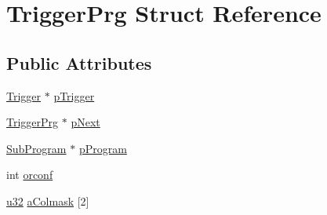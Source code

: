 \hypertarget{struct_trigger_prg}{\section{Trigger\-Prg Struct Reference}
\label{struct_trigger_prg}
}
\subsection*{Public Attributes}
\begin{DoxyCompactItemize}
\item 
\hyperlink{struct_trigger}{Trigger} $\ast$ \hyperlink{struct_trigger_prg_af70e5a74c954bc7a1eb8ee1162c40368}{p\-Trigger}
\item 
\hyperlink{struct_trigger_prg}{Trigger\-Prg} $\ast$ \hyperlink{struct_trigger_prg_a551b8a29a8c4ff785afab1596e5d8710}{p\-Next}
\item 
\hyperlink{struct_sub_program}{Sub\-Program} $\ast$ \hyperlink{struct_trigger_prg_aa770aee270c7c5df85578dc4a6686134}{p\-Program}
\item 
int \hyperlink{struct_trigger_prg_aa475acda58c472b3491f6aa17020bf68}{orconf}
\item 
\hyperlink{sqlite3_8c_a03ad5adfaeb9b7640dde78a0cc390319}{u32} \hyperlink{struct_trigger_prg_aeac0a4cd1f1d287981ae33c4d171b614}{a\-Colmask} \mbox{[}2\mbox{]}
\end{DoxyCompactItemize}


